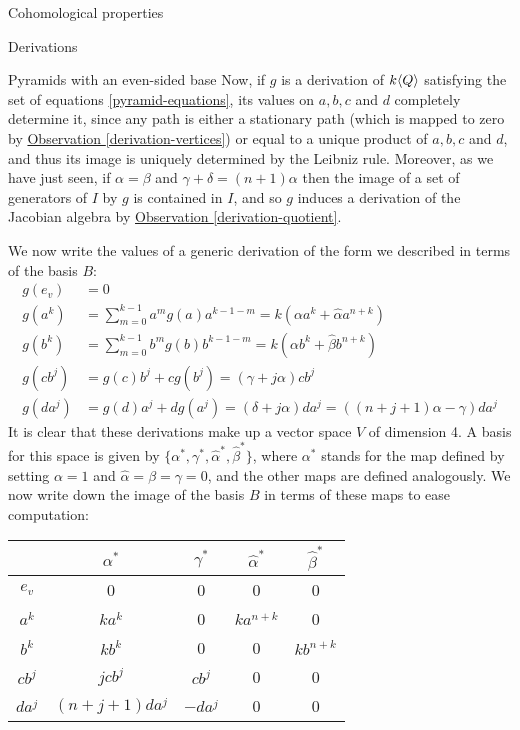 \begin{chapter}{Cohomological properties}
\begin{section}{Derivations}
\begin{subsection}{Pyramids with an even-sided base}
Now, if $g$ is a derivation of $k\langle Q\rangle$ satisfying the set of equations \eqref{pyramid-equations}, its values on $a,b,c$ and $d$ completely determine it, since any path is either a stationary path (which is mapped to zero by \hyperref[derivation-vertices]{Observation \ref*{derivation-vertices}}) or equal to a unique product of $a,b,c$ and $d$, and thus its image is uniquely determined by the Leibniz rule. Moreover, as we have just seen, if $\alpha=\beta$ and $\gamma+\delta=(n+1)\alpha$ then the image of a set of generators of $I$ by $g$ is contained in $I$, and so $g$ induces a derivation of the Jacobian algebra  by \hyperref[derivation-quotient]{Observation \ref*{derivation-quotient}}.

We now write the values of a generic derivation of the form we described in terms of the basis $B$:
\begin{align*}
g(e_v) &= 0\\
g(a^k) &=\sum_{m=0}^{k-1} a^mg(a)a^{k-1-m}=k(\alpha a^k + \hat\alpha a^{n+k}) \\
g(b^k) &=\sum_{m=0}^{k-1}b^mg(b)b^{k-1-m}=k(\alpha b^k + \hat\beta b^{n+k})\\
g(cb^j) &= g(c)b^j + cg(b^j) = (\gamma+j\alpha) cb^j \\
g(da^j) &= g(d)a^j + dg(a^j) = (\delta+j\alpha) da^j = \left((n+j+1)\alpha-\gamma\right)da^j
\end{align*}
It is clear that these derivations make up a vector space $V$ of dimension 4. A basis for this space is given by $\{\alpha^*, \gamma^*, \hat\alpha^*, \hat\beta^*\}$, where $\alpha^*$ stands for the map defined by setting $\alpha=1$ and $\hat\alpha=\beta=\gamma=0$, and the other maps are defined analogously. We now write down the image of the basis $B$ in terms of these maps to ease computation:
\begin{center}
\begin{tabular}{ c | c | c | c | c }
	& 	$\alpha^*$ 		& $\gamma^*$	& $\hat\alpha^*$	& $\hat\beta^*$	\\
\hline
$e_v$ & 	0 			& 0 			& 0			& 0 \\
$a^k$ & 	$ka^k$ 		& 0			& $ka^{n+k}$	& 0 \\
$b^k$ & 	$kb^k$ 		& 0			& 0			& $kb^{n+k}$ \\
$cb^j$ & 	$jcb^j$ 		& $cb^j$		& 0			& 0 \\
$da^j$ & 	$(n+j+1)da^j$	& $-da^j$		& 0			& 0 
\end{tabular}
\end{center}


\end{subsection}
\end{section}
\end{chapter}
